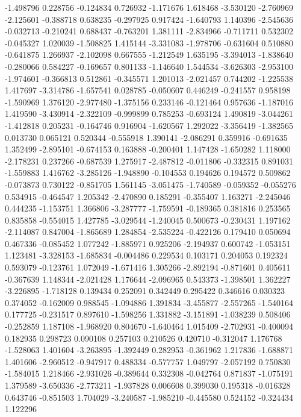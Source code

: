 -1.498796
0.228756
-0.124834
0.726932
-1.171676
1.618468
-3.530120
-2.760969
-2.125601
-0.388718
0.638235
-0.297925
0.917424
-1.640793
1.140396
-2.545636
-0.032713
-0.210241
0.688437
-0.763201
1.381111
-2.834966
-0.711711
0.532302
-0.045327
1.020039
-1.508825
1.415144
-3.331083
-1.978706
-0.631604
0.510880
-0.641875
1.266937
-2.102098
0.667555
-1.212549
1.635195
-3.394013
-1.838640
-0.280066
0.584227
-0.169657
0.801133
-1.146640
1.544534
-3.626303
-2.953100
-1.974601
-0.366813
0.512861
-0.345571
1.201013
-2.021457
0.744202
-1.225538
1.417697
-3.314786
-1.657541
0.028785
-0.050607
0.446249
-0.241557
0.958198
-1.590969
1.376120
-2.977480
-1.375156
0.233146
-0.121464
0.957636
-1.187016
1.419590
-3.430914
-2.322109
-0.999899
0.785253
-0.693124
1.490819
-3.044261
-1.412818
0.205231
-0.164746
0.916904
-1.620567
1.292022
-3.356419
-1.382565
0.013730
0.065121
0.520344
-0.555918
1.390141
-2.086291
0.359916
-0.691635
1.352499
-2.895101
-0.674153
0.163888
-0.200401
1.147428
-1.650282
1.118000
-2.178231
0.237266
-0.687539
1.275917
-2.487812
-0.011806
-0.332315
0.891031
-1.559883
1.416762
-3.285126
-1.948890
-0.104553
0.194626
0.194572
0.509862
-0.073873
0.730122
-0.851705
1.561145
-3.051475
-1.740589
-0.059352
-0.055276
0.534915
-0.464547
1.205342
-2.470890
0.185291
-0.355407
1.163271
-2.245046
0.444235
-1.153751
1.366806
-3.287777
-1.759591
-0.189365
0.381816
0.253565
0.835858
-0.554015
1.427785
-3.029544
-1.240045
0.500673
-0.230431
1.197162
-2.114087
0.847004
-1.865689
1.284854
-2.535224
-0.422126
0.179410
0.050694
0.467336
-0.085452
1.077242
-1.885971
0.925206
-2.194937
0.600742
-1.053151
1.123481
-3.328153
-1.685834
-0.004486
0.229534
0.103171
0.204053
0.192324
0.593079
-0.123761
1.072049
-1.671416
1.305266
-2.892194
-0.871601
0.405611
-0.367639
1.148344
-2.021428
1.176644
-2.096965
0.543373
-1.398501
1.362227
-3.226895
-1.718128
0.139434
0.252091
0.342449
0.295422
0.346616
0.030323
0.374052
-0.162009
0.988545
-1.094886
1.391834
-3.455877
-2.557265
-1.540164
0.177725
-0.231517
0.897610
-1.598256
1.331882
-3.151891
-1.038239
0.508406
-0.252859
1.187108
-1.968920
0.804670
-1.640464
1.015409
-2.702931
-0.400094
0.182935
0.298723
0.090108
0.257103
0.210526
0.420710
-0.312047
1.176768
-1.528063
1.401604
-3.263895
-1.392449
0.282953
-0.361962
1.217836
-1.688871
1.401606
-2.960512
-0.947917
0.488334
-0.577757
1.049797
-2.057192
0.750830
-1.584015
1.218466
-2.931026
-0.389644
0.332308
-0.042764
0.871837
-1.075191
1.379589
-3.650336
-2.773211
-1.937828
0.006608
0.399030
0.195318
-0.016328
0.643746
-0.851503
1.704029
-3.240587
-1.985210
-0.445580
0.524152
-0.324434
1.122296
